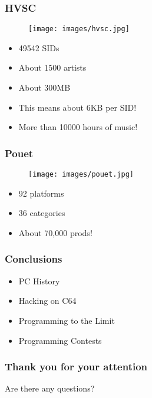 \documentclass[aspectratio=43]{uva-inf-presentation}
\begin{document}

\begin{frame}
\frametitle{HVSC}

\begin{figure}
\texttt{[image: images/hvsc.jpg]}
\end{figure}

\begin{itemize}
\item 49542 SIDs
\item About 1500 artists
\item About 300MB
\item This means about 6KB per SID!
\item More than 10000 hours of music!
\end{itemize}

\end{frame}


\begin{frame}
\frametitle{Pouet}

\begin{figure}
\texttt{[image: images/pouet.jpg]}
\end{figure}

\begin{itemize}
\item 92 platforms
\item 36 categories
\item About 70,000 prods!
\end{itemize}

\end{frame}


\begin{frame}
\frametitle{Conclusions}

\begin{itemize}
\item PC History
\item Hacking on C64
\item Programming to the Limit
\item Programming Contests
\end{itemize}

\end{frame}





\begin{frame}
\frametitle{Thank you for your attention}
\Large{\centerline{Are there any questions?}}
\end{frame}
\end{document}
